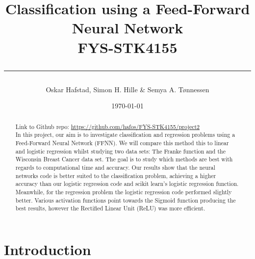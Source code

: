 \documentclass[english,notitlepage,reprint,nofootinbib]{revtex4-2}  %
\begin{document}
\title{\vspace*{-2cm}\bf Classification using a Feed-Forward Neural Network \hspace*{5cm}\\
FYS-STK4155\\
\rule{\textwidth}{0.05cm}}


\author{Oskar Hafstad, Simon H. Hille & Semya A. Tønnessen}
\date{\today}

\begin{abstract} 
\centering Link to Github repo: \url{https://github.com/hafos/FYS-STK4155/project2}
\vspace{3mm}
\\
In this project, our aim is to investigate classification and regression problems using a Feed-Forward Neural Network (FFNN). We will compare this method this to linear and logistic regression whilst studying two data sets: The Franke function and the Wisconsin Breast Cancer data set. 
The goal is to study which methods are best with regards to computational time and accuracy. 
Our results show that the neural networks code is better suited to the classification problem, achieving a higher accuracy than our logistic regression code and scikit learn's logistic regression function. Meanwhile, for the regression problem the logistic regression code performed slightly better. Various activation functions point towards the Sigmoid function producing the best results, however the Rectified Linear Unit (ReLU) was more efficient. 
\end{abstract}
\maketitle

\section{Introduction} 
\end{document}
